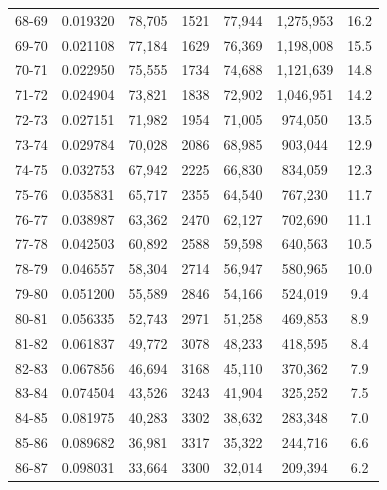 \documentclass[12pt,a4paper]{article}
\begin{document}
\begin{longtable}{|c|c|c|c|c|c|c|}
68-69  & 0.019320      & 78,705       & 1521          & 77,944        & 1,275,953    & 16.2         \\
69-70  & 0.021108      & 77,184       & 1629          & 76,369        & 1,198,008    & 15.5         \\
70-71  & 0.022950      & 75,555       & 1734          & 74,688        & 1,121,639    & 14.8         \\
71-72  & 0.024904      & 73,821       & 1838          & 72,902        & 1,046,951    & 14.2         \\
72-73  & 0.027151      & 71,982       & 1954          & 71,005        & 974,050      & 13.5         \\
73-74  & 0.029784      & 70,028       & 2086          & 68,985        & 903,044      & 12.9         \\
74-75  & 0.032753      & 67,942       & 2225          & 66,830        & 834,059      & 12.3         \\
75-76  & 0.035831      & 65,717       & 2355          & 64,540        & 767,230      & 11.7         \\
76-77  & 0.038987      & 63,362       & 2470          & 62,127        & 702,690      & 11.1         \\
77-78  & 0.042503      & 60,892       & 2588          & 59,598        & 640,563      & 10.5         \\
78-79  & 0.046557      & 58,304       & 2714          & 56,947        & 580,965      & 10.0         \\
79-80  & 0.051200      & 55,589       & 2846          & 54,166        & 524,019      & 9.4          \\
80-81  & 0.056335      & 52,743       & 2971          & 51,258        & 469,853      & 8.9          \\
81-82  & 0.061837      & 49,772       & 3078          & 48,233        & 418,595      & 8.4          \\
82-83  & 0.067856      & 46,694       & 3168          & 45,110        & 370,362      & 7.9          \\
83-84  & 0.074504      & 43,526       & 3243          & 41,904        & 325,252      & 7.5          \\
84-85  & 0.081975      & 40,283       & 3302          & 38,632        & 283,348      & 7.0          \\
85-86  & 0.089682      & 36,981       & 3317          & 35,322        & 244,716      & 6.6          \\
86-87  & 0.098031      & 33,664       & 3300          & 32,014        & 209,394      & 6.2          \\

\end{longtable}
\end{document}
